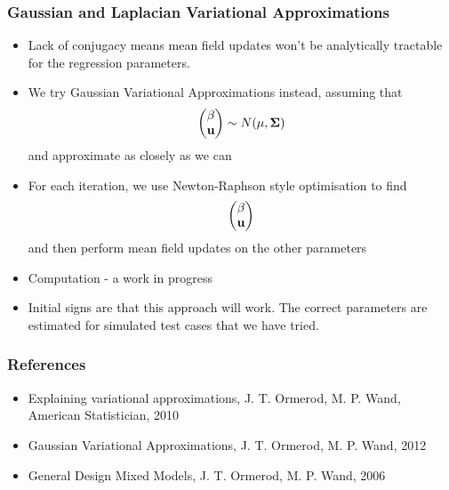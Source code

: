 \documentclass{beamer}
\begin{document}
\begin{frame}
\frametitle{Gaussian and Laplacian Variational Approximations}
\begin{itemize}
\item Lack of conjugacy means mean field updates won't be analytically tractable for the regression parameters.
\item We try Gaussian Variational Approximations instead, assuming that
$$
\begin{pmatrix}
\beta \\
\bf u
\end{pmatrix}
\sim N(\bf \mu, \Sigma)
$$
and approximate as closely as we can
\item For each iteration, we use Newton-Raphson style optimisation to find
$$
\begin{pmatrix}
\beta \\
\bf u
\end{pmatrix}
$$
and then perform mean field updates on the other parameters
\item Computation - a work in progress
\item Initial signs are that this approach will work. The correct parameters are estimated for simulated test cases
that we have tried.
\end{itemize}
\end{frame}

\begin{frame}
\frametitle{References}
\begin{itemize}
\item Explaining variational approximations, J. T. Ormerod, M. P. Wand, American Statistician, 2010
\item Gaussian Variational Approximations, J. T. Ormerod, M. P. Wand, 2012
\item General Design Mixed Models, J. T. Ormerod, M. P. Wand, 2006
\end{itemize}
\end{frame}
\end{document}
